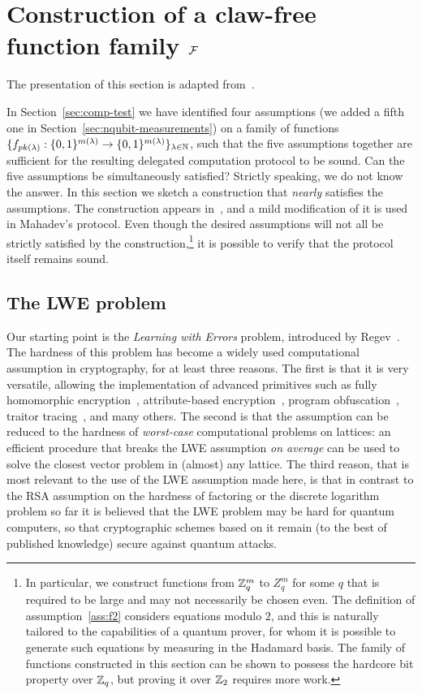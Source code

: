 \section{Construction of a claw-free function family $\mathcal{F}$}
\label{sec:tcf-construction}

The presentation of this section is adapted from~\cite{vidick2020verifying}. 

In Section~\ref{sec:comp-test} we have identified four assumptions (we added a fifth one in Section~\ref{sec:nqubit-measurements}) on a family of functions $\{f_{pk(\lambda)}:\{0,1\}^{m(\lambda)}\to\{0,1\}^{m(\lambda)}\}_{\lambda\in\mathbb{N}}$, such that the five assumptions together are sufficient for the resulting delegated computation protocol to be sound. Can the five assumptions be simultaneously satisfied? Strictly speaking, we do not know the answer. In this section we sketch a construction that \emph{nearly} satisfies the assumptions. The construction appears in~\cite{brakerski2018cryptographic}, and a mild modification of it is used in Mahadev's protocol. Even though the desired assumptions will not all be strictly satisfied by the construction,\footnote{In particular, we construct functions from $\mathbb{Z}_q^m$ to $Z_q^m$ for some $q$ that is required to be large and may not necessarily be chosen even. The definition of assumption~\ref{ass:f2} considers equations modulo $2$, and this is naturally tailored to the capabilities of a quantum prover, for whom it is possible to generate such equations by measuring in the Hadamard basis. The family of functions constructed in this section can be shown to possess the hardcore bit property over $\mathbb{Z}_q$, but proving it over $\mathbb{Z}_2$ requires more work.} it is possible to verify that the protocol itself remains sound.


\subsection{The LWE problem}

Our starting point is the \emph{Learning with Errors} problem, introduced by Regev~\cite{regev2009lattices}. The hardness of this problem has become a widely used computational assumption in cryptography, for at least three reasons. The first is that it is very versatile, allowing the implementation of advanced primitives such as fully homomorphic encryption~\cite{gentry2009fully,brakerski2014efficient}, attribute-based encryption~\cite{gorbunov2015attribute}, program obfuscation~\cite{wichs2017obfuscating,goyal2017lockable}, traitor tracing~\cite{goyal2018collusion}, and many others. The second is that the assumption can be reduced to the hardness of \emph{worst-case} computational problems on lattices: an efficient procedure that breaks the LWE assumption \emph{on average} can be used to solve the closest vector problem in (almost) {any} lattice. The third reason, that is most relevant to the use of the LWE assumption made here, is that in contrast to the RSA assumption on the hardness of factoring or the discrete logarithm problem so far it is believed that the LWE problem may be hard for quantum computers, so that cryptographic schemes based on it remain (to the best of published knowledge) secure against quantum attacks. 

